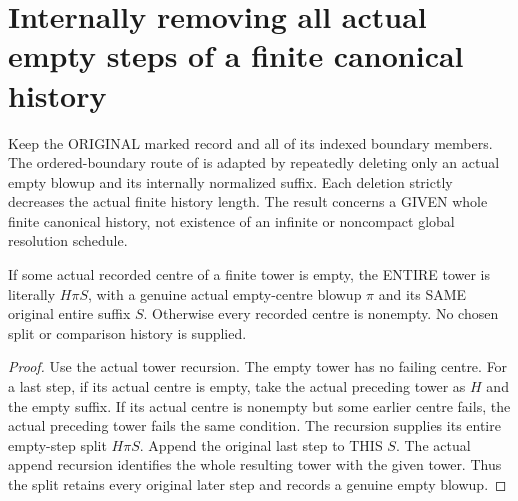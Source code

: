 \section{Internally removing all actual empty steps of a finite canonical history}

Keep the ORIGINAL marked record and all of its indexed boundary members.
The ordered-boundary route of
\cite{wlodarczyk05-hironaka,bierstone-milman08-functoriality} is adapted by
repeatedly deleting only an actual empty blowup and its internally normalized
suffix. Each deletion strictly decreases the actual finite history length.
The result concerns a GIVEN whole finite canonical history, not existence
of an infinite or noncompact global resolution schedule.

\begin{lemma}
\label{hir:original-finite-history-actual-empty-step-occurrence}
\leanok
If some actual recorded centre of a finite tower is empty, the ENTIRE
tower is literally $H\pi S$, with a genuine actual empty-centre blowup
$\pi$ and its SAME original entire suffix $S$. Otherwise every recorded
centre is nonempty. No chosen split or comparison history is supplied.
\end{lemma}
\begin{proof}
Use the actual tower recursion. The empty tower has no failing centre.
For a last step, if its actual centre is empty, take the actual preceding
tower as $H$ and the empty suffix. If its actual centre is nonempty but
some earlier centre fails, the actual preceding tower fails the same
condition. The recursion supplies its entire empty-step split $H\pi S$.
Append the original last step to THIS $S$. The actual append recursion
identifies the whole resulting tower with the given tower. Thus the split
retains every original later step and records a genuine empty blowup.
\end{proof}

